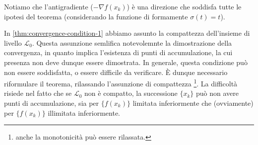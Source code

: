 Notiamo che l'antigradiente ($-\nabla f(x_{k})$) è una direzione che soddisfa tutte le ipotesi del teorema  (considerando la funzione di formamente $\sigma(t)=t$).

In \cref{thm:convergence-condition-1} abbiamo assunto la compattezza dell'insieme di livello $\mathcal{L}_{0}$. Questa assunzione semlifica notevolemnte la dimostrazione della convergenza, in quanto implica l'esistenza di punti di accumulazione, la cui presenza non deve dunque essere dimostrata.
In generale, questa condizione può non essere soddisfatta, o essere difficile da verificare. È dunque necessario riformulare il teorema, rilassando l'assunzione di compattezza \footnote{anche la monotonicità può essere rilassata.}. La difficoltà risiede nel fatto che se $\mathcal{L}_{0}$ non è compatto, la successione $\{x_{k}\}$ può non avere punti di accumulazione, sia per $\{f(x_{k})\}$ limitata inferiormente che (ovviamente) per $\{f(x_{k})\}$ illimitata inferiormente.

